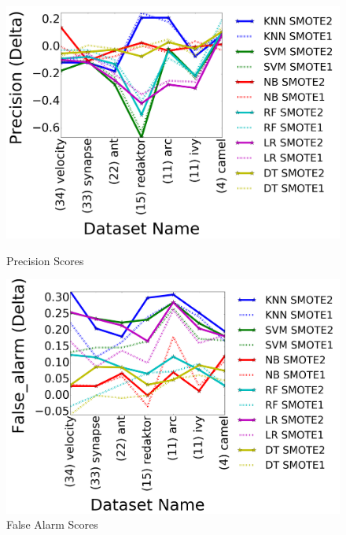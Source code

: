 \begin{figure}[!htbp]
    \centering
      \begin{minipage}{.49\textwidth}
        \captionsetup{justification=centering}
        \includegraphics[width=\linewidth]{./fig/Precision_tuned2.png}
  \caption{Precision Scores}
  \label{Precision}
    \end{minipage}%
  \begin{minipage}{.49\textwidth}
        \captionsetup{justification=centering}
        \includegraphics[width=\linewidth]{./fig/False_alarm_tuned2.png}
  \caption{False Alarm Scores}
  \label{false}
    \end{minipage}%
\end{figure}

